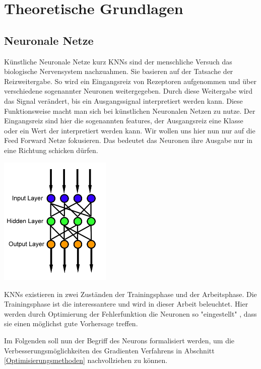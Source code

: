 
\section{Theoretische Grundlagen}\label{Theoretische Grundlagen}


\subsection{Neuronale Netze}\label{Neuronale Netze}

Künstliche Neuronale Netze kurz KNNs sind der menschliche Versuch das biologische Nervensystem nachzuahmen. Sie basieren auf der Tatsache der Reizweitergabe. So wird ein Eingangsreiz von Rezeptoren aufgenommen und über verschiedene sogenannter Neuronen weitergegeben. Durch diese Weitergabe wird das Signal verändert, bis ein Ausgangssignal interpretiert werden kann. Diese Funktionsweise macht man sich bei künstlichen Neuronalen Netzen zu nutze. Der Eingangsreiz sind hier die sogenannten \grqq features\grqq{}, der Ausgangsreiz eine Klasse oder ein Wert der interpretiert werden kann. Wir wollen uns hier nun nur auf die \grqq Feed Forward\grqq{} Netze fokusieren. Das bedeutet das Neuronen ihre Ausgabe nur in eine Richtung schicken dürfen.


\begin{center}
 \includegraphics[width=0.4\textwidth]{abb/Feed_forward_neural_net.png}
\end{center}


KNNs existieren in zwei Zuständen der Trainingsphase und der Arbeitsphase. Die Trainingsphase ist die interessantere und wird in dieser Arbeit beleuchtet. Hier werden durch Optimierung der Fehlerfunktion die Neuronen so "eingestellt" , dass sie einen möglichst gute Vorhersage treffen. 

Im Folgenden soll nun der Begriff des Neurons formalisiert werden, um die Verbesserungsmöglichkeiten des Gradienten Verfahrens in Abschnitt \ref{Optimisierungsmethoden} nachvollziehen zu können.


